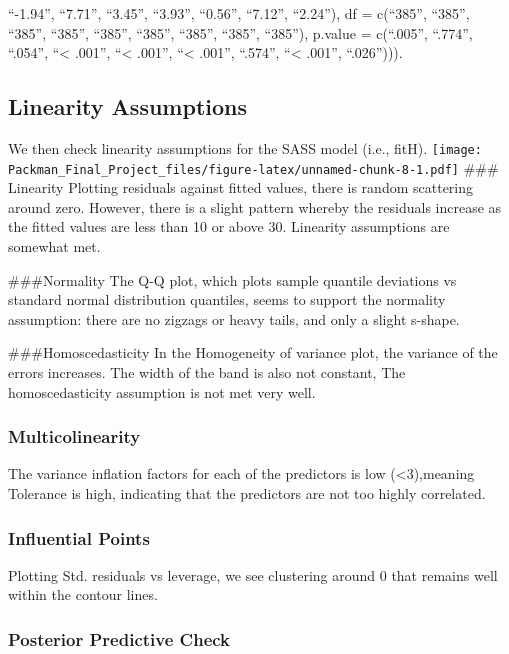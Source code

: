 \documentclass[
  doc,draftall]{apa6}
\begin{document}
``-1.94'', ``7.71'', ``3.45'', ``3.93'', ``0.56'', ``7.12'', ``2.24''), df = c(``385'', ``385'', ``385'', ``385'', ``385'', ``385'', ``385'', ``385'', ``385''), p.value = c(``.005'', ``.774'', ``.054'', ``\textless{} .001'', ``\textless{} .001'', ``\textless{} .001'', ``.574'', ``\textless{} .001'', ``.026''))).

\subsection{Linearity Assumptions}\label{linearity-assumptions}

We then check linearity assumptions for the SASS model (i.e., fitH).
\texttt{[image: Packman\_Final\_Project\_files/figure-latex/unnamed-chunk-8-1.pdf]}
\#\#\# Linearity
Plotting residuals against fitted values, there is random scattering around zero. However, there is a slight pattern whereby the residuals increase as the fitted values are less than 10 or above 30. Linearity assumptions are somewhat met.

\#\#\#Normality
The Q-Q plot, which plots sample quantile deviations vs standard normal distribution quantiles, seems to support the normality assumption: there are no zigzags or heavy tails, and only a slight s-shape.

\#\#\#Homoscedasticity
In the Homogeneity of variance plot, the variance of the errors increases. The width of the band is also not constant, The homoscedasticity assumption is not met very well.

\subsubsection{Multicolinearity}\label{multicolinearity}

The variance inflation factors for each of the predictors is low (\textless3),meaning Tolerance is high, indicating that the predictors are not too highly correlated.

\subsubsection{Influential Points}\label{influential-points}

Plotting Std. residuals vs leverage, we see clustering around 0 that remains well within the contour lines.

\subsubsection{Posterior Predictive Check}\label{posterior-predictive-check}
\end{document}
